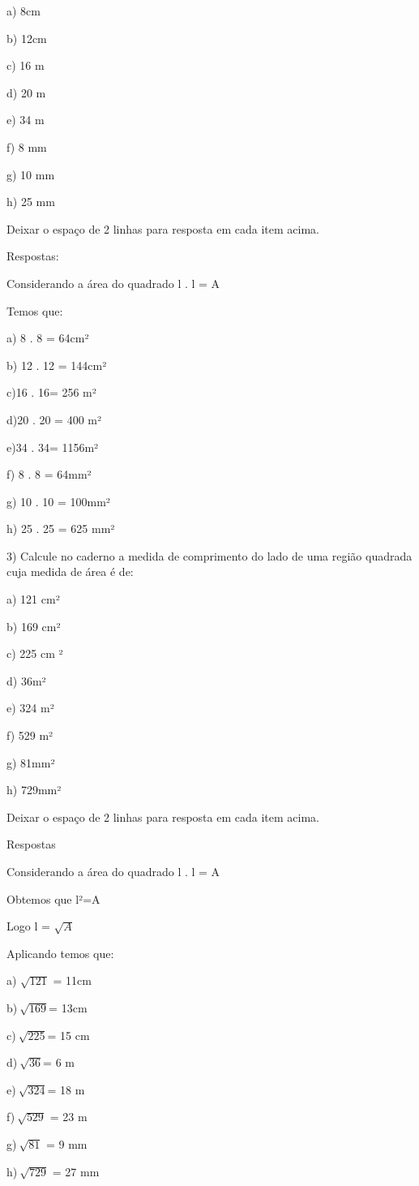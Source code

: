a) 8cm

b) 12cm

c) 16 m

d) 20 m

e) 34 m

f) 8 mm

g) 10 mm

h) 25 mm

Deixar o espaço de 2 linhas para resposta em cada item acima.

Respostas:

Considerando a área do quadrado l . l = A

Temos que:

a) 8 . 8 = 64cm²

b) 12 . 12 = 144cm²

c)16 . 16= 256 m²

d)20 . 20 = 400 m²

e)34 . 34= 1156m²

f) 8 . 8 = 64mm²

g) 10 . 10 = 100mm²

h) 25 . 25 = 625 mm²

3) Calcule no caderno a medida de comprimento do lado de uma região
quadrada cuja medida de área é de:

a) 121 cm²

b) 169 cm²

c) 225 cm ²

d) 36m²

e) 324 m²

f) 529 m²

g) 81mm²

h) 729mm²

Deixar o espaço de 2 linhas para resposta em cada item acima.

Respostas

Considerando a área do quadrado l . l = A

Obtemos que l²=A

Logo l = \(\sqrt{A}\)

Aplicando temos que:

a) \(\sqrt{121}\) = 11cm

b)\(\ \sqrt{169}\)= 13cm

c)\(\ \sqrt{225}\)= 15 cm

d)\(\ \sqrt{36}\)= 6 m

e)\(\ \sqrt{324}\)= 18 m

f)\(\ \sqrt{529}\) = 23 m

g)\(\ \sqrt{81}\) = 9 mm

h)\(\ \sqrt{729}\) = 27 mm

